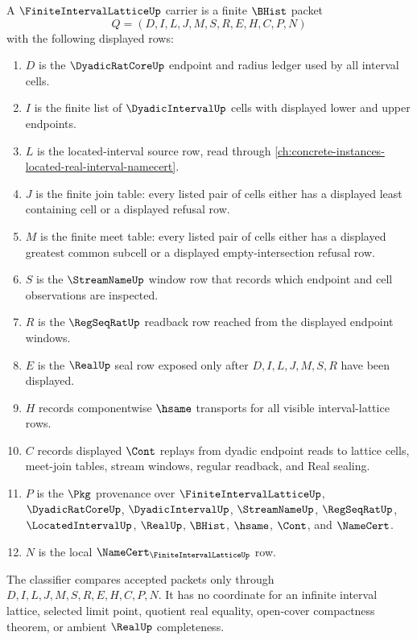 \begin{definition}
\label{def:finite-interval-lattice-carrier}
A $\FiniteIntervalLatticeUp$ carrier is a finite $\BHist$ packet
$$
Q=(D,I,L,J,M,S,R,E,H,C,P,N)
$$
with the following displayed rows:
\begin{enumerate}
\item $D$ is the $\DyadicRatCoreUp$ endpoint and radius ledger used by all interval cells.
\item $I$ is the finite list of $\DyadicIntervalUp$ cells with displayed lower and upper endpoints.
\item $L$ is the located-interval source row, read through \autoref{ch:concrete-instances-located-real-interval-namecert}.
\item $J$ is the finite join table: every listed pair of cells either has a displayed least containing cell or a displayed refusal row.
\item $M$ is the finite meet table: every listed pair of cells either has a displayed greatest common subcell or a displayed empty-intersection refusal row.
\item $S$ is the $\StreamNameUp$ window row that records which endpoint and cell observations are inspected.
\item $R$ is the $\RegSeqRatUp$ readback row reached from the displayed endpoint windows.
\item $E$ is the $\RealUp$ seal row exposed only after $D,I,L,J,M,S,R$ have been displayed.
\item $H$ records componentwise $\hsame$ transports for all visible interval-lattice rows.
\item $C$ records displayed $\Cont$ replays from dyadic endpoint reads to lattice cells, meet-join tables, stream windows, regular readback, and Real sealing.
\item $P$ is the $\Pkg$ provenance over $\FiniteIntervalLatticeUp$, $\DyadicRatCoreUp$, $\DyadicIntervalUp$, $\StreamNameUp$, $\RegSeqRatUp$, $\LocatedIntervalUp$, $\RealUp$, $\BHist$, $\hsame$, $\Cont$, and $\NameCert$.
\item $N$ is the local $\NameCert_{\FiniteIntervalLatticeUp}$ row.
\end{enumerate}
The classifier compares accepted packets only through $D,I,L,J,M,S,R,E,H,C,P,N$. It has no coordinate for an infinite interval lattice, selected limit point, quotient real equality, open-cover compactness theorem, or ambient $\RealUp$ completeness.
\end{definition}

